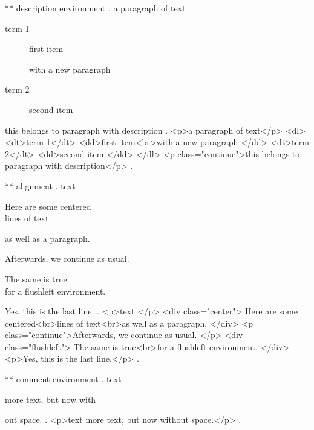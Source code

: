 ** description environment
.
a paragraph of text

\begin{description}
    \item[term 1] first item

        with a new paragraph
    \item[term 2] second item
\end{description}
this belongs to paragraph with description
.
<p>a paragraph of text</p>
<dl>
<dt>term 1</dt>
<dd>ﬁrst item<br>with a new paragraph </dd>
<dt>term 2</dt>
<dd>second item </dd>
</dl>
<p class="continue">this belongs to paragraph with description</p>
.


** alignment
.
text
\begin{center}
    Here are some centered\\
    lines of text

    as well as a paragraph.
\end{center}
Afterwards, we continue as usual.
\begin{flushleft}
    The same is true\\
    for a flushleft environment.
\end{flushleft}

Yes, this is the last line.
.
<p>text </p>
<div class="center"> Here are some centered<br>lines of text<br>as well as a paragraph. </div>
<p class="continue">Afterwards, we continue as usual. </p>
<div class="flushleft"> The same is true<br>for a ﬂushleft environment. </div>
<p>Yes, this is the last line.</p>
.



** comment environment
.
text
\begin{comment}
    This is a comment.
    \end{comment
    still more comment.
\end{comment}
more text, but now with%
\begin{comment}
    This is a comment.
\end{comment}
out space.
.
<p>text more text, but now without space.</p>
.